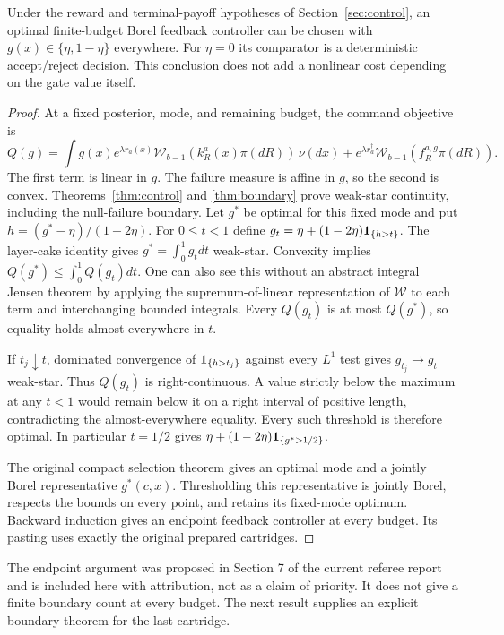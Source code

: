 \begin{theorem}\label{thm:endpoint}
Under the reward and terminal-payoff hypotheses of Section~\ref{sec:control},
an optimal finite-budget Borel feedback controller can be chosen with
$g(x)\in\{\eta,1-\eta\}$ everywhere. For $\eta=0$ its comparator is a
deterministic accept/reject decision. This conclusion does not add a
nonlinear cost depending on the gate value itself.
\end{theorem}
\begin{proof}
At a fixed posterior, mode, and remaining budget, the command objective is
\[
 Q(g)=\int g(x)e^{\lambda r_a(x)}
               \mathcal W_{b-1}(k_R^a(x)\pi(dR))\,\nu(dx)
       +e^{\lambda r_a^\dagger}\mathcal W_{b-1}(f_R^{a,g}\pi(dR)).
\]
The first term is linear in $g$. The failure measure is affine in $g$, so
the second is convex. Theorems~\ref{thm:control} and \ref{thm:boundary}
prove weak-star continuity, including the null-failure boundary. Let $g^*$
be optimal for this fixed mode and put $h=(g^*-\eta)/(1-2\eta)$.
For $0\le t<1$ define $g_t=\eta+(1-2\eta)\mathbf1_{\{h>t\}}$.
The layer-cake identity gives $g^*=\int_0^1g_tdt$ weak-star. Convexity
implies $Q(g^*)\le\int_0^1Q(g_t)dt$. One can also see this without an
abstract integral Jensen theorem by applying the supremum-of-linear
representation of $\mathcal W$ to each term and interchanging bounded
integrals. Every $Q(g_t)$ is at most $Q(g^*)$, so equality holds almost
everywhere in $t$.

If $t_j\downarrow t$, dominated convergence of $\mathbf1_{\{h>t_j\}}$ against
every $L^1$ test gives $g_{t_j}\to g_t$ weak-star. Thus $Q(g_t)$ is
right-continuous. A value strictly below the maximum at any $t<1$ would
remain below it on a right interval of positive length, contradicting the
almost-everywhere equality. Every such threshold is therefore optimal.
In particular $t=1/2$ gives
$\eta+(1-2\eta)\mathbf1_{\{g^*>1/2\}}$.

The original compact selection theorem gives an optimal mode and a jointly
Borel representative $g^*(c,x)$. Thresholding this representative is jointly
Borel, respects the bounds on every point, and retains its fixed-mode
optimum. Backward induction gives an endpoint feedback controller at every
budget. Its pasting uses exactly the original prepared cartridges.
\end{proof}

The endpoint argument was proposed in Section 7 of the current referee
report and is included here with attribution, not as a claim of priority.
It does not give a finite boundary count at every budget. The next result
supplies an explicit boundary theorem for the last cartridge.

